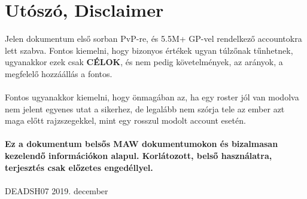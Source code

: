 \documentclass[11pt]{report}
\begin{document}

\chapter{Utószó, Disclaimer}
Jelen dokumentum első sorban PvP-re, és 5.5M+ GP-vel rendelkező accountokra lett szabva. Fontos kiemelni, hogy bizonyos értékek ugyan túlzőnak tűnhetnek, ugyanakkor ezek csak \textbf{CÉLOK}, és nem pedig követelmények, az arányok, a megfelelő hozzáállás a fontos.
\\
\\
Fontos ugyanakkor kiemelni, hogy önmagában az, ha egy roster jól van modolva nem jelent egyenes utat a sikerhez, de legalább nem szórja tele az ember azt maga előtt rajzszegekkel, mint egy rosszul modolt account esetén.
\\
\\
\textbf{Ez a dokumentum belsős MAW dokumentumokon és bizalmasan kezelendő információkon alapul. Korlátozott, belső használatra, terjesztés csak előzetes engedéllyel.}
\\
\\
\LARGE\textcopyright DEADSH07 2019. december
\end{document}
